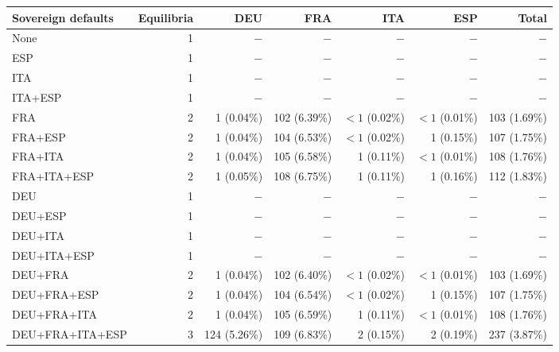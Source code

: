 \begin{tabular*}{\textwidth}{@{\extracolsep{\fill}}lrrrrrr@{}}
\toprule
Sovereign defaults & Equilibria & DEU & FRA & ITA & ESP & Total \\
\midrule
None & 1 & $-$ & $-$ & $-$ & $-$ & $-$ \\
ESP & 1 & $-$ & $-$ & $-$ & $-$ & $-$ \\
ITA & 1 & $-$ & $-$ & $-$ & $-$ & $-$ \\
ITA+ESP & 1 & $-$ & $-$ & $-$ & $-$ & $-$ \\
FRA & 2 & 1 (0.04\%) & 102 (6.39\%) & $<1$ (0.02\%) & $<1$ (0.01\%) & 103 (1.69\%) \\
FRA+ESP & 2 & 1 (0.04\%) & 104 (6.53\%) & $<1$ (0.02\%) & 1 (0.15\%) & 107 (1.75\%) \\
FRA+ITA & 2 & 1 (0.04\%) & 105 (6.58\%) & 1 (0.11\%) & $<1$ (0.01\%) & 108 (1.76\%) \\
FRA+ITA+ESP & 2 & 1 (0.05\%) & 108 (6.75\%) & 1 (0.11\%) & 1 (0.16\%) & 112 (1.83\%) \\
DEU & 1 & $-$ & $-$ & $-$ & $-$ & $-$ \\
DEU+ESP & 1 & $-$ & $-$ & $-$ & $-$ & $-$ \\
DEU+ITA & 1 & $-$ & $-$ & $-$ & $-$ & $-$ \\
DEU+ITA+ESP & 1 & $-$ & $-$ & $-$ & $-$ & $-$ \\
DEU+FRA & 2 & 1 (0.04\%) & 102 (6.40\%) & $<1$ (0.02\%) & $<1$ (0.01\%) & 103 (1.69\%) \\
DEU+FRA+ESP & 2 & 1 (0.04\%) & 104 (6.54\%) & $<1$ (0.02\%) & 1 (0.15\%) & 107 (1.75\%) \\
DEU+FRA+ITA & 2 & 1 (0.04\%) & 105 (6.59\%) & 1 (0.11\%) & $<1$ (0.01\%) & 108 (1.76\%) \\
DEU+FRA+ITA+ESP & 3 & 124 (5.26\%) & 109 (6.83\%) & 2 (0.15\%) & 2 (0.19\%) & 237 (3.87\%) \\
\bottomrule
\end{tabular*}
